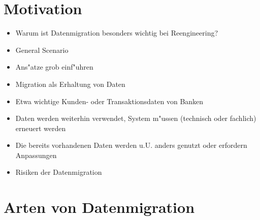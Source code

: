 \documentclass[11pt]{scrartcl}
\begin{document}
\section{Motivation}

\begin{itemize}
	\item Warum ist Datenmigration besonders wichtig bei Reengineering?
	\item General Scenario
	\item Ans"atze grob einf"uhren
	\item Migration als Erhaltung von Daten
	\item Etwa wichtige Kunden- oder Transaktionsdaten von Banken
	\item Daten werden weiterhin verwendet, System m"ussen (technisch oder fachlich) erneuert werden
	\item Die bereits vorhandenen Daten werden u.U. anders genutzt oder erfordern Anpassungen
	\item Risiken der Datenmigration
\end{itemize}

\section{Arten von Datenmigration}
\end{document}
